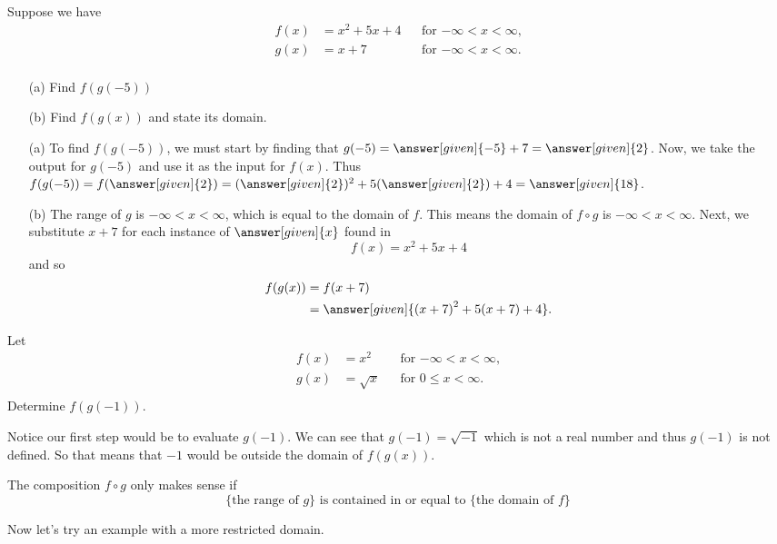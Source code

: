 \documentclass{ximera}
\begin{document}
\begin{example}
 Suppose we have
\begin{align*}
  f(x)&={{x}^{2}}+5x+4 &&\text{for $-\infty< x< \infty$,}\\
  g(x)&= x+7 &&\text{for $-\infty< x< \infty$.}\\
\end{align*}
\begin{enumerate}
    \item[(a)] Find $f(g(-5))$ 
    \item[(b)] Find $f(g(x))$ and state its domain.
\end{enumerate}

\begin{explanation}

\begin{enumerate}
    
\item[(a)] To find $f(g(-5))$, we must start by finding that $g(-5)=\answer[given]{-5}+7=\answer[given]{2}$. Now, we take the output for $g(-5)$ and use it as the input for $f(x)$. Thus $f(g(-5))=f(\answer[given]{2})=(\answer[given]{2})^2+5(\answer[given]{2})+4=\answer[given]{18}$. 
  \item[(b)] The range of $g$ is $-\infty< x< \infty$, which is equal to the
  domain of $f$. This means the domain of $f\circ g$ is $-\infty< x<
  \infty$. Next, we substitute $x+7$ for each instance of $\answer[given]{x}$ found
  in
  \[
  f(x)={{x}^{2}}+5x+4
  \]
  and so
  \begin{align*}
  f(g(x)) &=f(x+7)\\
  &=\answer[given]{{{(x+7)}^{2}}+5(x+7)+4}.
  \end{align*}
  \end{enumerate}
\end{explanation}
\end{example}
\begin{example}
    Let
    \begin{align*}
  f(x)&=x^2 &&\text{for $-\infty< x< \infty$,}\\
  g(x)&= \sqrt{x} &&\text{for $0\le x< \infty$.}\\
\end{align*}
Determine $f(g(-1))$.
\begin{explanation}
    Notice our first step would be to evaluate $g(-1)$. We can see that $g(-1)=\sqrt{-1}$ which is not a real number and thus $g(-1)$ is not defined. So that means that $-1$ would be outside the domain of $f(g(x))$. 
\end{explanation}
\end{example}
\begin{warning}
  The composition $f\circ g$ only makes sense if
  \[
  \{\text{the range of $g$}\}
  \text{ is contained in or equal to }
  \{\text{the domain of $f$}\}
  \]
\end{warning}
Now let's try an example with a more restricted domain.
\end{document}
